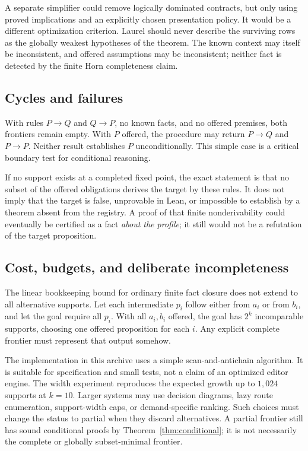 \documentclass[11pt,a4paper]{article}
\theoremstyle{definition}
\theoremstyle{remark}
\begin{document}
A separate simplifier could remove logically dominated contracts, but only using proved implications and an explicitly chosen presentation policy. It would be a different optimization criterion. Laurel should never describe the surviving rows as the globally weakest hypotheses of the theorem. The known context may itself be inconsistent, and offered assumptions may be inconsistent; neither fact is detected by the finite Horn completeness claim.

\subsection{Cycles and failures}
With rules $P\to Q$ and $Q\to P$, no known facts, and no offered premises, both frontiers remain empty. With $P$ offered, the procedure may return $P\to Q$ and $P\to P$. Neither result establishes $P$ unconditionally. This simple case is a critical boundary test for conditional reasoning.

If no support exists at a completed fixed point, the exact statement is that no subset of the offered obligations derives the target by these rules. It does not imply that the target is false, unprovable in Lean, or impossible to establish by a theorem absent from the registry. A proof of that finite nonderivability could eventually be certified as a fact \emph{about the profile}; it still would not be a refutation of the target proposition.

\subsection{Cost, budgets, and deliberate incompleteness}
The linear bookkeeping bound for ordinary finite fact closure does not extend to all alternative supports. Let each intermediate $p_i$ follow either from $a_i$ or from $b_i$, and let the goal require all $p_i$. With all $a_i,b_i$ offered, the goal has $2^k$ incomparable supports, choosing one offered proposition for each $i$. Any explicit complete frontier must represent that output somehow.

The implementation in this archive uses a simple scan-and-antichain algorithm. It is suitable for specification and small tests, not a claim of an optimized editor engine. The width experiment reproduces the expected growth up to $1,024$ supports at $k=10$. Larger systems may use decision diagrams, lazy route enumeration, support-width caps, or demand-specific ranking. Such choices must change the status to partial when they discard alternatives. A partial frontier still has sound conditional proofs by Theorem~\ref{thm:conditional}; it is not necessarily the complete or globally subset-minimal frontier.
\end{document}
